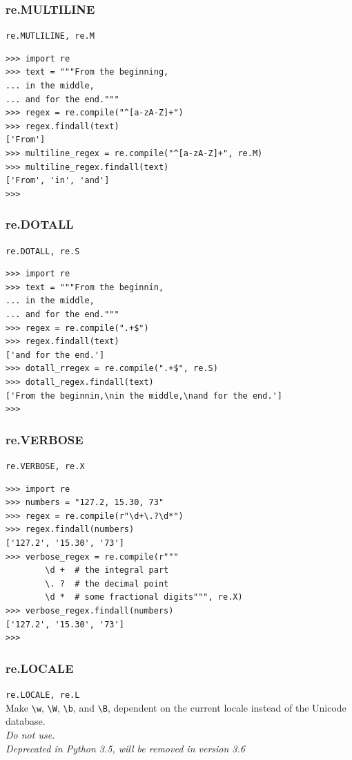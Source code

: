 \documentclass{beamer}
\begin{document}
\subsubsection{re.MULTILINE}
\begin{frame}[fragile]
\verb/re.MUTLILINE, re.M/ \\
\begin{lstlisting}
>>> import re
>>> text = """From the beginning,
... in the middle,
... and for the end."""
>>> regex = re.compile("^[a-zA-Z]+")
>>> regex.findall(text)
['From']
>>> multiline_regex = re.compile("^[a-zA-Z]+", re.M)
>>> multiline_regex.findall(text)
['From', 'in', 'and']
>>>
\end{lstlisting}
\end{frame}

\subsubsection{re.DOTALL}
\begin{frame}[fragile]
\verb/re.DOTALL, re.S/ \\
\begin{lstlisting}
>>> import re
>>> text = """From the beginnin,
... in the middle,
... and for the end."""
>>> regex = re.compile(".+$")
>>> regex.findall(text)
['and for the end.']
>>> dotall_rregex = re.compile(".+$", re.S)
>>> dotall_regex.findall(text)
['From the beginnin,\nin the middle,\nand for the end.']
>>>
\end{lstlisting}
\end{frame}

\subsubsection{re.VERBOSE}
\begin{frame}[fragile]
\verb/re.VERBOSE, re.X/ \\
\begin{lstlisting}
>>> import re
>>> numbers = "127.2, 15.30, 73"
>>> regex = re.compile(r"\d+\.?\d*")
>>> regex.findall(numbers)
['127.2', '15.30', '73']
>>> verbose_regex = re.compile(r"""
        \d +  # the integral part
        \. ?  # the decimal point
        \d *  # some fractional digits""", re.X)
>>> verbose_regex.findall(numbers)
['127.2', '15.30', '73']
>>>
\end{lstlisting}
\end{frame}

\subsubsection{re.LOCALE}
\begin{frame}[fragile]
\verb/re.LOCALE, re.L/ \\
Make \verb/\w/, \verb/\W/, \verb/\b/, and \verb/\B/, dependent on the current locale instead of the Unicode database. \\
\textit{Do not use. \\
Deprecated in Python 3.5, will be removed in version 3.6}
\end{frame}
\end{document}
